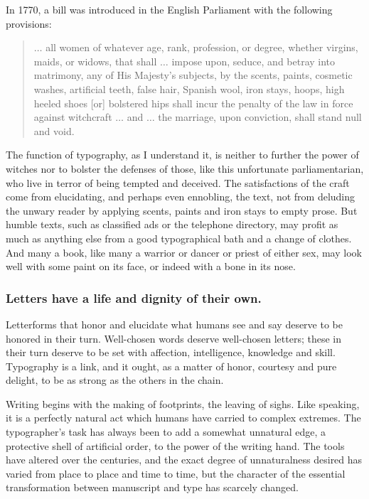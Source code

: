 In 1770, a bill was introduced in the English Parliament with the following provisions:
\begin{quote}$\ldots$ all women of whatever age, rank, profession, or degree, whether virgins, maids, or widows, that shall $\ldots$ impose upon, seduce, and betray into matrimony, any of His Majesty's subjects, by the scents, paints, cosmetic washes, artificial teeth, false hair, Spanish wool, iron stays, hoops, high heeled shoes {\rm [}or{\rm ]} bolstered hips shall incur the pen\-alty of the law in force against witchcraft $\ldots$ and $\ldots$ the marriage, upon conviction, shall stand null and void.
\end{quote}
The function of typography, as I understand it, is neither to further the power of witches nor to bolster the defenses of those, like this unfortunate parliamentarian, who live in terror of being tempted and deceived. The satisfactions of the craft come from elucidating, and perhaps even ennobling, the text, not from deluding the unwary reader by applying scents, paints and iron stays to empty prose. But humble texts, such as classified ads or the telephone directory, may profit as much as anything else from a good typographical bath and a change of clothes. And many a book, like many a warrior or dancer or priest of either sex, may look well with some paint on its face, or indeed with a bone in its nose.

\subsubsection{Letters have a life and dignity of their own.}

Letterforms that honor and elucidate what humans see and say deserve to be honored in their turn. Well-chosen words deserve well-chosen letters; these in their turn deserve to be set with affection, intelligence, knowledge and skill. Typography is a link, and it ought, as a matter of honor, courtesy and pure delight, to be as strong as the others in the chain.

Writing begins with the making of footprints, the leaving of sighs. Like speaking, it is a perfectly natural act which humans have carried to complex extremes. The typographer's task has always been to add a somewhat unnatural edge, a protective shell of artificial order, to the power of the writing hand. The tools have altered over the centuries, and the exact degree of unnaturalness desired has varied from place to place and time to time, but the character of the essential transformation between manuscript and type has scarcely changed.

